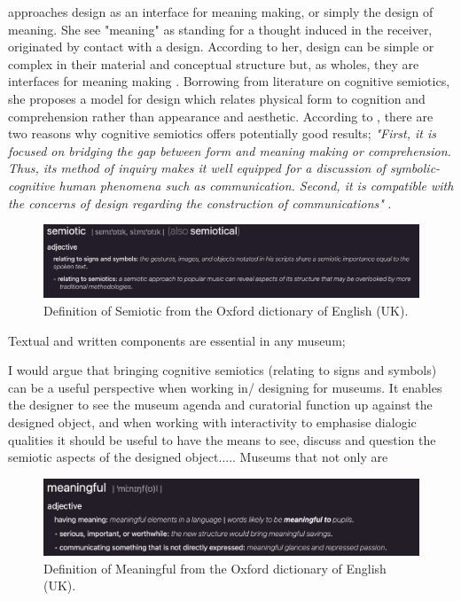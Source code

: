 \autocite{kazmierczak_meaningmaking_2003} approaches design as an interface for meaning making, or simply the design of meaning. She see "meaning" as standing for a thought induced in the receiver, originated by contact with a design. According to her, design can be simple or complex in their material and conceptual structure but, as wholes, they are interfaces for meaning making \autocite[p. 47]{kazmierczak_meaningmaking_2003}. Borrowing from literature on cognitive semiotics, she proposes a model for design which relates physical form to cognition and comprehension rather than appearance and aesthetic. According to \autocite{kazmierczak_meaningmaking_2003}, there are two reasons why cognitive semiotics offers potentially good results; \emph{"First, it is focused on bridging the gap between form and meaning making or comprehension. Thus, its method of inquiry makes it well equipped for a discussion of symbolic-cognitive human phenomena such as communication. Second, it is compatible with the concerns of design regarding the construction of communications"} \autocite[p. 47]{kazmierczak_meaningmaking_2003}. 

\begin{figure}[H]
\includegraphics[width=12.5cm]{pictures/background/semiotic.png}
\caption{Definition of Semiotic from the Oxford dictionary of English (UK).}
\centering
\end{figure}

Textual and written components are essential in any museum; 

I would argue that bringing cognitive semiotics (relating to signs and symbols) can be a useful perspective when working in/ designing for museums. It enables the designer to see the museum agenda and curatorial function up against the designed object, and when working with interactivity to emphasise dialogic qualities it should be useful to have the means to see, discuss and question the semiotic aspects of the designed object..... Museums that not only are 

\begin{figure}[H]
\includegraphics[width=12.5cm]{pictures/background/meaningful.png}
\caption{Definition of Meaningful from the Oxford dictionary of English (UK).}
\centering
\end{figure}


